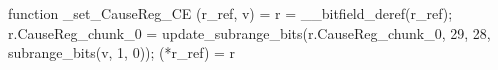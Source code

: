 function _set_CauseReg_CE (r_ref, v) = {
    r = __bitfield_deref(r_ref);
    r.CauseReg_chunk_0 = update_subrange_bits(r.CauseReg_chunk_0, 29, 28, subrange_bits(v, 1, 0));
    (*r_ref) = r
}
